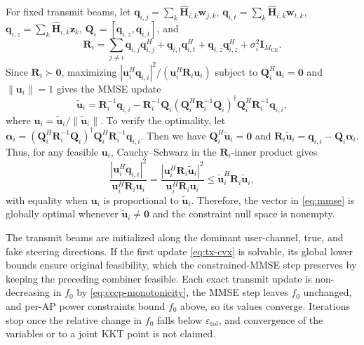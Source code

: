 \documentclass[letterpaper,journal]{IEEEtran}
\begin{document}
For fixed transmit beams, let $\mathbf{q}_{i,j}=\sum_k\widehat{\mathbf{H}}_{i,k}\mathbf{w}_{j,k}$, $\mathbf{q}_{i,t}=\sum_k\widehat{\mathbf{H}}_{i,k}\mathbf{w}_{t,k}$, $\mathbf{q}_{i,z}=\sum_k\widehat{\mathbf{H}}_{i,k}\mathbf{z}_k$, $\mathbf{Q}_i=[\mathbf{q}_{i,z},\mathbf{q}_{i,t}]$, and
\begin{equation}
\mathbf{R}_i=\sum_{j\neq i}\mathbf{q}_{i,j}\mathbf{q}_{i,j}^H+\mathbf{q}_{i,t}\mathbf{q}_{i,t}^H+\mathbf{q}_{i,z}\mathbf{q}_{i,z}^H+\sigma_i^2\mathbf{I}_{M_{\mathrm{UE}}}.
\label{eq:interference-cov}
\end{equation}
Since $\mathbf R_i\succ\mathbf0$, maximizing $|\mathbf{u}_i^H\mathbf{q}_{i,i}|^2/(\mathbf{u}_i^H\mathbf{R}_i\mathbf{u}_i)$ subject to $\mathbf{Q}_i^H\mathbf{u}_i=\mathbf0$ and $\|\mathbf u_i\|=1$ gives the MMSE update
\begin{equation}
\widetilde{\mathbf{u}}_i
=\mathbf{R}_i^{-1}\mathbf{q}_{i,i}
-\mathbf{R}_i^{-1}\mathbf{Q}_i
\left(\mathbf{Q}_i^H\mathbf{R}_i^{-1}\mathbf{Q}_i\right)^\dagger
\mathbf{Q}_i^H\mathbf{R}_i^{-1}\mathbf{q}_{i,i},
\label{eq:mmse}
\end{equation}
where $\mathbf{u}_i={\widetilde{\mathbf{u}}_i}/{\|\widetilde{\mathbf{u}}_i\|}$. To verify the optimality, let $\boldsymbol{\alpha}_i=(\mathbf Q_i^H\mathbf R_i^{-1}\mathbf Q_i)^\dagger\mathbf Q_i^H\mathbf R_i^{-1}\mathbf q_{i,i}$. Then we have $\mathbf Q_i^H\widetilde{\mathbf u}_i=\mathbf0$ and $\mathbf R_i\widetilde{\mathbf u}_i=\mathbf q_{i,i}-\mathbf Q_i\boldsymbol{\alpha}_i$. Thus, for any feasible $\mathbf u_i$, Cauchy--Schwarz in the $\mathbf R_i$-inner product gives
\begin{equation}
\frac{|\mathbf u_i^H\mathbf q_{i,i}|^2}{\mathbf u_i^H\mathbf R_i\mathbf u_i}
=\frac{|\mathbf u_i^H\mathbf R_i\widetilde{\mathbf u}_i|^2}{\mathbf u_i^H\mathbf R_i\mathbf u_i}
\le \widetilde{\mathbf u}_i^H\mathbf R_i\widetilde{\mathbf u}_i,
\label{eq:mmse-optimality}
\end{equation}
with equality when $\mathbf u_i$ is proportional to $\widetilde{\mathbf u}_i$. Therefore, the vector in \eqref{eq:mmse} is globally optimal whenever $\widetilde{\mathbf u}_i\neq\mathbf0$ and the constraint null space is nonempty.

The transmit beams are initialized along the dominant user-channel, true, and fake steering directions. If the first update \eqref{eq:tx-cvx} is solvable, its global lower bounds ensure original feasibility, which the constrained-MMSE step preserves by keeping the preceding combiner feasible. Each exact transmit update is non-decreasing in $f_0$ by \eqref{eq:cccp-monotonicity}, the MMSE step leaves $f_0$ unchanged, and per-AP power constraints bound $f_0$ above, so its values converge. Iterations stop once the relative change in $f_0$ falls below $\varepsilon_{\mathrm{tol}}$, and convergence of the variables or to a joint KKT point is not claimed.
\end{document}
